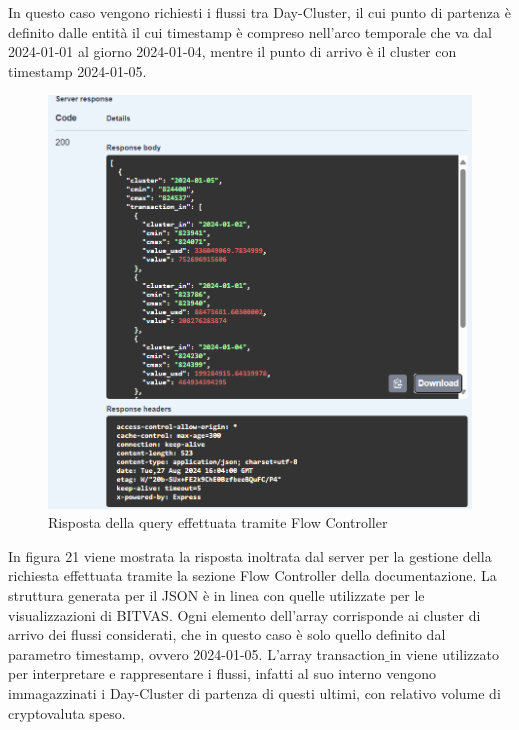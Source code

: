 In questo caso vengono richiesti i flussi tra Day-Cluster, il cui punto di partenza è definito dalle entità il cui timestamp è compreso nell'arco temporale che va dal 2024-01-01 al giorno 2024-01-04, mentre il punto di arrivo è il cluster con timestamp 2024-01-05.

\begin{figure}[H]
    \centering \includegraphics[keepaspectratio=true,scale=0.5]{Images/responseFlowController.png}
    \caption{Risposta della query effettuata tramite Flow Controller}
\end{figure}
In figura 21 viene mostrata la risposta inoltrata dal server per la gestione della richiesta effettuata tramite la sezione Flow Controller della documentazione.
La struttura generata per il JSON è in linea con quelle utilizzate per le visualizzazioni di BITVAS.
Ogni elemento dell'array corrisponde ai cluster di arrivo dei flussi considerati, che in questo caso è solo quello definito dal parametro timestamp, ovvero 2024-01-05.
L'array transaction$\_$in viene utilizzato per interpretare e rappresentare i flussi, infatti al suo interno vengono immagazzinati i Day-Cluster di partenza di questi ultimi, con relativo volume di cryptovaluta speso. 
\thispagestyle{mystyle}
